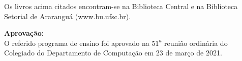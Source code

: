 Os livros acima citados encontram-se na Biblioteca Central e na Biblioteca Setorial de Ararangu\'a (www.bu.ufsc.br).

\vskip1cm

{\bf Aprovação: }\\

O referido programa de ensino foi aprovado na $51^a$ reuni\~ao ordin\'aria do Colegiado do Departamento de Computa\c c\~ao em 23 de março de 2021.
